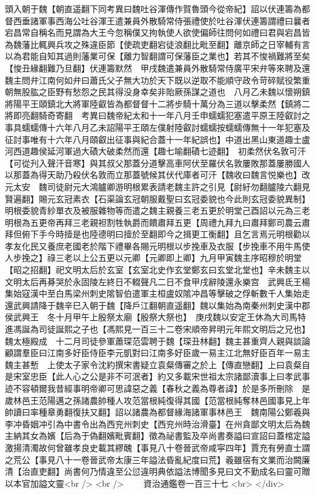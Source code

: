 頭入朝于魏【朝直遥翻下同考異曰魏吐谷渾傳作賀魯頭今從帝紀】詔以伏連籌為都督西垂諸軍事西海公吐谷渾王遣兼員外散騎常侍張禮使於吐谷渾伏連籌謂禮曰曩者宕昌常自稱名而見謂為大王今忽稱僕又拘執使人欲使偏師往問何如禮曰君與宕昌皆為魏藩比輒興兵攻之殊違臣節【使疏吏翻宕徒浪翻比毗至翻】離京師之日宰輔有言以為君能自知其過則藩業可保【離力智翻謂可保藩臣之業也】若其不悛禍難將至矣【悛丑緣翻難乃旦翻】伏連籌默然　甲戌魏遣兼員外散騎常侍廣平宋弁等來聘及還魏主問弁江南何如弁曰蕭氏父子無大功於天下既以逆取不能順守政令苛碎賦役繁重朝無股肱之臣野有愁怨之民其得没身幸矣非貽厥孫謀之道也　八月乙未魏以懷朔鎮將陽平王頤鎮北大將軍陸叡皆為都督督十二將步騎十萬分為三道以擊柔然【鎮將二將即亮翻騎奇寄翻　考異曰魏帝紀太和十一年八月壬申蠕蠕犯塞遣平原王陸叡討之事具蠕蠕傳十六年八月乙未詔陽平王頤左僕射陸叡討蠕蠕按蠕蠕傳無十一年犯塞及征討事唯有十六年八月頤叡出征事與紀合蓋十一年紀誤也】中道出黑山東道趣士盧河西道趣侯延河軍過大磧大破柔然而還【趣七喻翻磧七迹翻】　初柔然伏名敦可汗【可從刋入聲汗音寒】與其叔父那蓋分道擊高車阿伏至羅伏名敦屢敗那蓋屢勝國人以那蓋為得天助乃殺伏名敦而立那蓋號候其伏代庫者可汗【魏收曰魏言悦樂也】改元太安　魏司徒尉元大鴻臚卿游明根累表請老魏主許之引見【尉紆勿翻臚陵六翻見賢遍翻】賜元玄冠素衣【石渠論玄冠朝服戴聖曰玄冠委貌也今此則玄冠委貌異制】明根委貌青紗單衣及被服雜物等而遣之魏主親養三老五更於明堂己酉詔以元為三老明根為五更帝再拜三老親袒割牲執爵而饋肅拜五更【周禮九拜九曰肅拜鄭司農云肅拜但俯下手今時撎是也陸德明曰撎於至翻即今之揖更工衡翻】且乞言焉元明根勸以孝友化民又養庶老國老於階下禮畢各賜元明根以步挽車及衣服【步挽車不用牛馬使人步挽之】祿三老以上公五更以元卿【元卿即上卿】九月甲寅魏主序昭穆於明堂【昭之招翻】祀文明太后於玄室【玄室北史作玄堂鄭玄曰玄堂北堂也】辛未魏主以文明太后再朞哭於永固陵左終日不輟聲凡二日不食甲戌辭陵還永樂宫　武興氐王楊集始寇漢中至白馬梁州刺史隂智伯遣軍主桓盧奴隂冲昌等擊破之俘斬數千人集始走還武興請降于魏辛巳入朝于魏【降戶江翻朝直遥翻】魏以集始為南秦州刺史漢中郡侯武興王　冬十月甲午上殷祭太廟【殷祭大祭也】　庚戌魏以安定王休為大司馬特進馮誕為司徒誕熙之子也【馮熙見一百三十二卷宋順帝昇明元年熙文明后之兄也】　魏太極殿成　十二月司徒參軍蕭琛范雲聘于魏【琛丑林翻】魏主甚重齊人親與談論顧謂羣臣曰江南多好臣侍臣李元凱對曰江南多好臣歲一易主江北無好臣百年一易主魏主甚慙　上使太子家令沈約撰宋書疑立袁粲傳審之於上【傳直戀翻】上曰袁粲自是宋室忠臣【此人心之公是非不可泯者】約又多載宋世祖太宗諸鄙瀆事上曰孝武事迹不容頓爾我昔經事明帝卿可思諱惡之義【春秋之義為尊者諱】於是多所刪除　是歲林邑王范陽邁之孫諸農帥種人攻范當根純復得其國【范當根純奪林邑國事見上年帥讀曰率種章勇翻復扶又翻】詔以諸農為都督緣海諸軍事林邑王　魏南陽公鄭羲與李冲昏姻冲引為中書令出為西兖州刺史【西兖州時治滑臺】在州貪鄙文明太后為魏主納其女為嬪【后為于偽翻嬪毗賓翻】徵為祕書監及卒尚書奏謚曰宣詔曰蓋棺定謚激揚清濁故何曾雖孝良史載其繆醜【事見八十卷晉武帝咸寜四年】賈充有勞直士謂之荒公【事見八十一卷晉武帝太康三年謚法昏亂紀度曰荒】羲雖宿有文業而治闕廉清【治直吏翻】尚書何乃情違至公愆違明典依謚法博聞多見曰文不勤成名曰靈可贈以本官加謚文靈<br />
<br />
　　資治通鑑卷一百三十七  <br>
   </div> 

